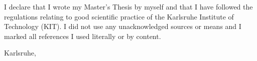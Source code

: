 \thispagestyle{empty}

\vspace*{15.85cm}

I declare that I wrote my Master’s Thesis by myself and that I have followed the regulations relating to good scientific practice of the Karlsruhe Institute of Technology (KIT). I did not use any unacknowledged sources or means and I marked all references I used literally or by content.

\vspace{0.5cm}

Karlsruhe, \abgabe

\vspace{1.4cm}

\student\addWithPreCommaSpace{\studentgrad}